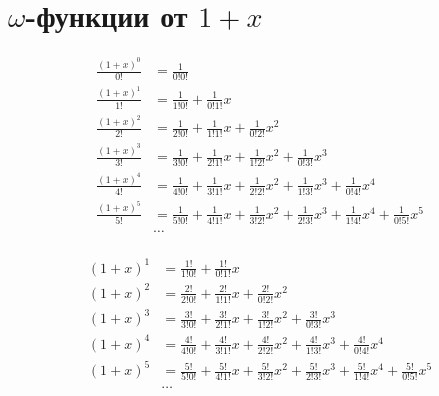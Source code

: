 
\section{$\omega$-функции от $1 + x$}

\begin{equation*}
\begin{aligned}
\frac{(1 + x)^0}{0!} &=
  \frac{1}{0!0!} 
\\
\frac{(1 + x)^1}{1!} &=
  \frac{1}{1!0!} 
+ \frac{1}{0!1!} x
\\
\frac{(1 + x)^2}{2!} &= 
  \frac{1}{2!0!} 
+ \frac{1}{1!1!} x 
+ \frac{1}{0!2!} x^2
\\
\frac{(1 + x)^3}{3!} &=
  \frac{1}{3!0!} 
+ \frac{1}{2!1!} x 
+ \frac{1}{1!2!} x^2 
+ \frac{1}{0!3!} x^3
\\
\frac{(1 + x)^4}{4!} &=
  \frac{1}{4!0!} 
+ \frac{1}{3!1!} x 
+ \frac{1}{2!2!} x^2 
+ \frac{1}{1!3!} x^3 
+ \frac{1}{0!4!} x^4
\\
\frac{(1 + x)^5}{5!} &=
  \frac{1}{5!0!} 
+ \frac{1}{4!1!} x 
+ \frac{1}{3!2!} x^2 
+ \frac{1}{2!3!} x^3 
+ \frac{1}{1!4!} x^4
+ \frac{1}{0!5!} x^5
\\
&\ldots
\\
\end{aligned}
\end{equation*}

\begin{equation*}
\begin{aligned}
(1 + x)^1 &=
  \frac{1!}{1!0!} 
+ \frac{1!}{0!1!} x
\\
(1 + x)^2 &= 
  \frac{2!}{2!0!} 
+ \frac{2!}{1!1!} x 
+ \frac{2!}{0!2!} x^2
\\
(1 + x)^3 &=
  \frac{3!}{3!0!} 
+ \frac{3!}{2!1!} x 
+ \frac{3!}{1!2!} x^2 
+ \frac{3!}{0!3!} x^3
\\
(1 + x)^4 &=
  \frac{4!}{4!0!} 
+ \frac{4!}{3!1!} x 
+ \frac{4!}{2!2!} x^2 
+ \frac{4!}{1!3!} x^3 
+ \frac{4!}{0!4!} x^4
\\
(1 + x)^5 &=
  \frac{5!}{5!0!} 
+ \frac{5!}{4!1!} x 
+ \frac{5!}{3!2!} x^2 
+ \frac{5!}{2!3!} x^3 
+ \frac{5!}{1!4!} x^4
+ \frac{5!}{0!5!} x^5
\\
&\ldots
\\
\end{aligned}
\end{equation*}

